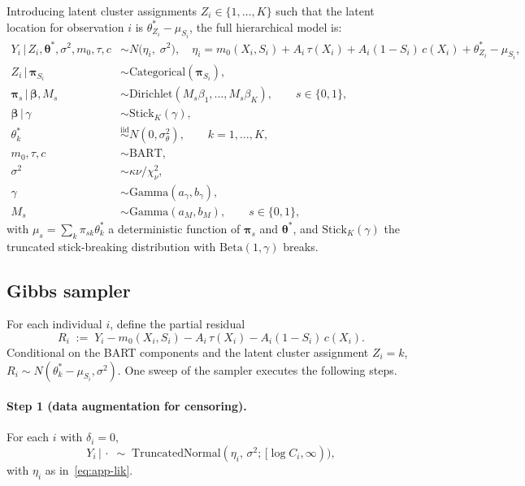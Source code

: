 \documentclass[11pt]{article}
\newcommand{\given}{\,|\,}
\begin{document}
Introducing latent cluster assignments $Z_i \in \{1, \ldots, K\}$ such that the latent location for observation $i$ is $\theta_{Z_i}^* - \mu_{S_i}$, the full hierarchical model is:
\begin{align}
Y_i \given Z_i, \bm{\theta}^*, \sigma^2, m_0, \tau, c &\sim N\!\big(\eta_i,\; \sigma^2\big), \quad \eta_i = m_0(X_i, S_i) + A_i\, \tau(X_i) + A_i(1 - S_i)\, c(X_i) + \theta_{Z_i}^* - \mu_{S_i}, \label{eq:app-lik} \\
Z_i \given \bm{\pi}_{S_i} &\sim \mathrm{Categorical}(\bm{\pi}_{S_i}), \\
\bm{\pi}_s \given \bm{\beta}, M_s &\sim \mathrm{Dirichlet}(M_s \beta_1, \ldots, M_s \beta_K), \qquad s \in \{0, 1\}, \\
\bm{\beta} \given \gamma &\sim \mathrm{Stick}_K(\gamma), \\
\theta_k^* &\stackrel{\mathrm{iid}}{\sim} N(0, \sigma_\theta^2), \qquad k = 1, \ldots, K, \\
m_0, \tau, c &\sim \mathrm{BART}, \\
\sigma^2 &\sim \kappa\nu / \chi^2_\nu, \\
\gamma &\sim \mathrm{Gamma}(a_\gamma, b_\gamma), \\
M_s &\sim \mathrm{Gamma}(a_M, b_M), \qquad s \in \{0, 1\},
\end{align}
with $\mu_s = \sum_k \pi_{sk} \theta_k^*$ a deterministic function of $\bm{\pi}_s$ and $\bm{\theta}^*$, and $\mathrm{Stick}_K(\gamma)$ the truncated stick-breaking distribution with $\mathrm{Beta}(1, \gamma)$ breaks.

\subsection{Gibbs sampler}
\label{app:hdp-gibbs}

For each individual $i$, define the partial residual
\begin{equation}
R_i \;:=\; Y_i - m_0(X_i, S_i) - A_i\, \tau(X_i) - A_i(1 - S_i)\, c(X_i).
\label{eq:app-Ri}
\end{equation}
Conditional on the BART components and the latent cluster assignment $Z_i = k$, $R_i \sim N(\theta_k^* - \mu_{S_i}, \sigma^2)$. One sweep of the sampler executes the following steps.

\paragraph{Step 1 (data augmentation for censoring).} For each $i$ with $\delta_i = 0$,
\begin{equation}
Y_i \given \cdot \;\sim\; \mathrm{TruncatedNormal}(\eta_i,\, \sigma^2;\, [\log C_i, \infty)),
\end{equation}
with $\eta_i$ as in~\eqref{eq:app-lik}.
\end{document}
